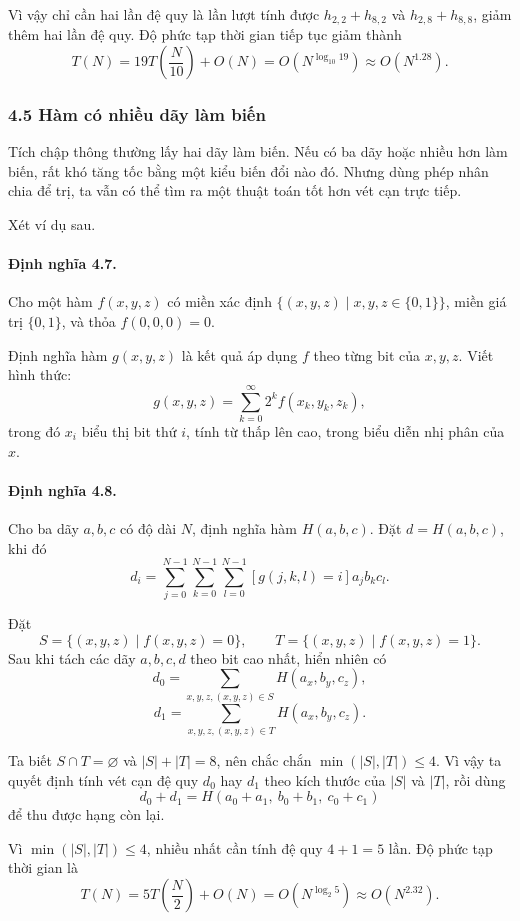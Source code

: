 \documentclass[11pt]{article}
\begin{document}
Vì vậy chỉ cần hai lần đệ quy là lần lượt tính được
\(h_{2,2}+h_{8,2}\) và \(h_{2,8}+h_{8,8}\), giảm thêm hai lần đệ quy. Độ phức
tạp thời gian tiếp tục giảm thành
\[
  T(N)=19T\left(\frac{N}{10}\right)+O(N)
  =
  O(N^{\log_{10}19})
  \approx O(N^{1.28}).
\]

\subsubsection*{4.5 Hàm có nhiều dãy làm biến}

Tích chập thông thường lấy hai dãy làm biến. Nếu có ba dãy hoặc nhiều hơn làm
biến, rất khó tăng tốc bằng một kiểu biến đổi nào đó. Nhưng dùng phép nhân chia
để trị, ta vẫn có thể tìm ra một thuật toán tốt hơn vét cạn trực tiếp.

Xét ví dụ sau.

\paragraph{Định nghĩa 4.7.}
Cho một hàm \(f(x,y,z)\) có miền xác định
\(\{(x,y,z)\mid x,y,z\in\{0,1\}\}\), miền giá trị \(\{0,1\}\), và thỏa
\(f(0,0,0)=0\).

Định nghĩa hàm \(g(x,y,z)\) là kết quả áp dụng \(f\) theo từng bit của
\(x,y,z\). Viết hình thức:
\[
  g(x,y,z)=\sum_{k=0}^{\infty}2^k f(x_k,y_k,z_k),
\]
trong đó \(x_i\) biểu thị bit thứ \(i\), tính từ thấp lên cao, trong biểu diễn
nhị phân của \(x\).

\paragraph{Định nghĩa 4.8.}
Cho ba dãy \(a,b,c\) có độ dài \(N\), định nghĩa hàm \(H(a,b,c)\). Đặt
\(d=H(a,b,c)\), khi đó
\[
  d_i=\sum_{j=0}^{N-1}\sum_{k=0}^{N-1}\sum_{l=0}^{N-1}
  [g(j,k,l)=i]a_jb_kc_l.
\]

Đặt
\[
  S=\{(x,y,z)\mid f(x,y,z)=0\},\qquad
  T=\{(x,y,z)\mid f(x,y,z)=1\}.
\]
Sau khi tách các dãy \(a,b,c,d\) theo bit cao nhất, hiển nhiên có
\[
  d_0=\sum_{x,y,z,(x,y,z)\in S}H(a_x,b_y,c_z),
\]
\[
  d_1=\sum_{x,y,z,(x,y,z)\in T}H(a_x,b_y,c_z).
\]

Ta biết \(S\cap T=\varnothing\) và \(|S|+|T|=8\), nên chắc chắn
\(\min(|S|,|T|)\le 4\). Vì vậy ta quyết định tính vét cạn đệ quy \(d_0\) hay
\(d_1\) theo kích thước của \(|S|\) và \(|T|\), rồi dùng
\[
  d_0+d_1=H(a_0+a_1,\ b_0+b_1,\ c_0+c_1)
\]
để thu được hạng còn lại.

Vì \(\min(|S|,|T|)\le 4\), nhiều nhất cần tính đệ quy \(4+1=5\) lần. Độ phức
tạp thời gian là
\[
  T(N)=5T\left(\frac{N}{2}\right)+O(N)
  =
  O(N^{\log_2 5})
  \approx O(N^{2.32}).
\]
\end{document}
